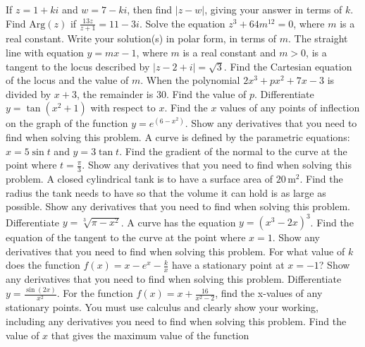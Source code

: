 \documentclass[12pt,addpoints]{exam}
\begin{document}
\begin{questions}
\fillwithlines{3cm}
\question[5] If \( z = 1 + ki \) and \( w = 7 - ki \), then find \( |z - w| \), giving your answer in terms of \( k \).
\fillwithlines{3cm}
\question[5] Find \( \text{Arg}(z) \) if \( \frac{13z}{z+1} = 11 - 3i \).
\fillwithlines{3cm}
\question[5] Solve the equation \( z^3 + 64m^{12} = 0 \), where \( m \) is a real constant. Write your solution(s) in polar form, in terms of \( m \).
\fillwithlines{3cm}
\question[5] The straight line with equation \( y = mx - 1 \), where \( m \) is a real constant and \( m > 0 \), is a tangent to the locus described by \( |z - 2 + i| = \sqrt{3} \). Find the Cartesian equation of the locus and the value of \( m \).
\fillwithlines{3cm}
\question[5] When the polynomial \(2x^3 + px^2 + 7x - 3\) is divided by \(x + 3\), the remainder is 30. Find the value of \(p\).
\fillwithlines{3cm}
\question[5] Differentiate \( y = \tan(x^2 + 1) \) with respect to \( x \).
\fillwithlines{3cm}
\question[5] Find the \( x \) values of any points of inflection on the graph of the function \( y = e^{(6 - x^2)} \). Show any derivatives that you need to find when solving this problem.
\fillwithlines{3cm}
\question[5] A curve is defined by the parametric equations: \( x = 5 \sin t \) and \( y = 3 \tan t \). Find the gradient of the normal to the curve at the point where \( t = \frac{\pi}{3} \). Show any derivatives that you need to find when solving this problem.
\fillwithlines{3cm}
\question[5] A closed cylindrical tank is to have a surface area of \(20 \, \text{m}^2\). Find the radius the tank needs to have so that the volume it can hold is as large as possible. Show any derivatives that you need to find when solving this problem.
\fillwithlines{3cm}
\question[5] Differentiate \( y = \sqrt[3]{\pi - x^2} \).
\fillwithlines{3cm}
\question[5] A curve has the equation \( y = (x^3 - 2x)^3 \). Find the equation of the tangent to the curve at the point where \( x = 1 \). Show any derivatives that you need to find when solving this problem.
\fillwithlines{3cm}
\question[5] For what value of \( k \) does the function \( f(x) = x - e^x - \frac{k}{x} \) have a stationary point at \( x = -1 \)? Show any derivatives that you need to find when solving this problem.
\fillwithlines{3cm}
\question[5] Differentiate \( y = \frac{\sin(2x)}{x^2} \).
\fillwithlines{3cm}
\question[5] For the function \( f(x) = x + \frac{16}{x^2 - 2} \), find the x-values of any stationary points. You must use calculus and clearly show your working, including any derivatives you need to find when solving this problem.
\fillwithlines{3cm}
\question[5] Find the value of \( x \) that gives the maximum value of the function


\end{questions}
\end{document}
